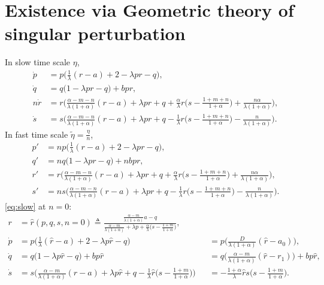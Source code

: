 \documentclass[a4paper,11pt]{article}
\begin{document}
\section{Existence via Geometric theory of singular perturbation}
In slow time scale $\eta$,
\begin{equation}
 \begin{aligned}
 \dot{p} &=p\Big(\frac{1}{\lambda}(r-a) + 2- \lambda p r -q\Big),\\
 \dot{q} &=q\Big(1 -\lambda p r -q\Big) + b p r,\\
 n\dot{r} &=r\Big(\frac{\alpha-m-n}{\lambda(1+\alpha)}(r-a) + \lambda pr + q +\frac{\alpha}{\lambda}r\big(s- \frac{1+m+n}{1+\alpha}\big) + \frac{n\alpha}{\lambda(1+\alpha)}\Big),\\
 \dot{s} &=s\Big(\frac{\alpha-m-n}{\lambda(1+\alpha)}(r-a) + \lambda pr + q - \frac{1}{\lambda}r\big(s- \frac{1+m+n}{1+\alpha}\big) - \frac{n}{\lambda(1+\alpha)}\Big).
 \end{aligned}
\end{equation}
In fast time scale $\tilde\eta=\frac{\eta}{n}$,
\begin{equation} \label{eq:fast}
 \begin{aligned}
 {p}' &=np\Big(\frac{1}{\lambda}(r-a) + 2- \lambda p r -q\Big),\\
 {q}' &=nq\Big(1 -\lambda p r -q\Big) + nb p r,\\
 {r}' &=r\Big(\frac{\alpha-m-n}{\lambda(1+\alpha)}(r-a) + \lambda pr + q +\frac{\alpha}{\lambda}r\big(s- \frac{1+m+n}{1+\alpha}\big) + \frac{n\alpha}{\lambda(1+\alpha)}\Big),\\
 {s}' &=ns\Big(\frac{\alpha-m-n}{\lambda(1+\alpha)}(r-a) + \lambda pr + q - \frac{1}{\lambda}r\big(s- \frac{1+m+n}{1+\alpha}\big) - \frac{n}{\lambda(1+\alpha)}\Big).
 \end{aligned}
\end{equation}
\eqref{eq:slow} at $n=0$:
\begin{equation}\label{eq:slow0}
 \begin{aligned}
 r &=\hat{r}(p,q,s,n=0) \triangleq \frac{ \frac{\alpha-m}{\lambda(1+\alpha)}a - q }{  \frac{\alpha-m}{\lambda(1+\alpha)} + \lambda p + \frac{\alpha}{\lambda}\big(s- \frac{1+m}{1+\alpha}\big)},\\%
 \dot{p} &=p\Big(\frac{1}{\lambda}(\hat{r}-a) + 2- \lambda p \hat{r} -q\Big) & &= p\Big(\frac{D}{\lambda(1+\alpha)}(\hat{r}-a_0)\Big),\\
 \dot{q} &=q\Big(1 -\lambda p \hat{r} -q\Big) + b p \hat{r} & &=q\Big(\frac{\alpha-m}{\lambda(1+\alpha)}(\hat{r}-r_1)\Big) + b p \hat{r},\\
 \dot{s} &=s\Big(\frac{\alpha-m}{\lambda(1+\alpha)}(\hat{r}-a) + \lambda p\hat{r} + q - \frac{1}{\lambda}\hat{r}\big(s- \frac{1+m}{1+\alpha}\big)\Big) &&= -\frac{1+\alpha}{\lambda}\hat{r}s\big(s- \frac{1+m}{1+\alpha}\big).
 \end{aligned}
\end{equation}
\end{document}
